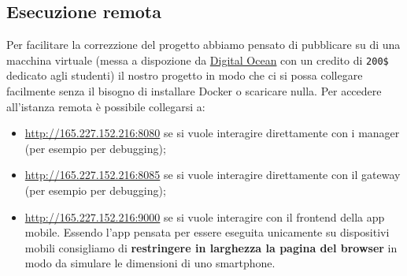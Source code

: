 \subsection{Esecuzione remota}
Per facilitare la correzzione del progetto abbiamo pensato di pubblicare su di una macchina virtuale (messa a dispozione da \href{https://www.digitalocean.com}{Digital Ocean} con un credito di \verb|200$| dedicato agli studenti) il nostro progetto in modo che ci si possa collegare facilmente senza il bisogno di installare Docker o scaricare nulla. Per accedere all'istanza remota è possibile collegarsi a:
\begin{itemize}
  \item \href{http://165.227.152.216:8080}{http://165.227.152.216:8080} se si vuole interagire direttamente con i manager (per esempio per debugging);
  \item \href{http://165.227.152.216:8085}{http://165.227.152.216:8085} se si vuole interagire direttamente con il gateway (per esempio per debugging);
  \item \href{http://165.227.152.216:9000}{http://165.227.152.216:9000} se si vuole interagire con il frontend della app mobile. Essendo l'app pensata per essere eseguita unicamente su dispositivi mobili consigliamo di \textbf{restringere in larghezza la pagina del browser} in modo da simulare le dimensioni di uno smartphone.
\end{itemize}
